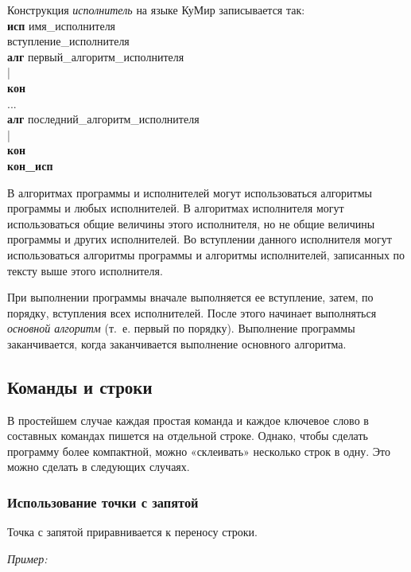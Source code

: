 \documentclass[12pt,a4paper]{article}
\begin{document}
Конструкция \emph{исполнитель} на языке КуМир записывается так:
{\sffamily\\
\textbf{исп} имя\_исполнителя\\
вступление\_исполнителя\\
\textbf{алг} первый\_алгоритм\_исполнителя\\
|\\
\textbf{кон}\\
...\\
\textbf{алг} последний\_алгоритм\_исполнителя\\
|\\
\textbf{кон}\\
\textbf{кон\_исп}
}

В алгоритмах программы и исполнителей могут использоваться алгоритмы программы и любых исполнителей. В алгоритмах исполнителя могут использоваться общие величины этого исполнителя, но не общие величины программы и других исполнителей. Во вступлении данного исполнителя могут использоваться алгоритмы программы и алгоритмы исполнителей, записанных по тексту выше этого исполнителя.

При выполнении программы вначале выполняется ее вступление, затем, по порядку, вступления всех исполнителей. После этого начинает выполняться \emph{основной алгоритм} (т.~е. первый по порядку). Выполнение программы заканчивается, когда заканчивается выполнение основного алгоритма.

\subsection{Команды и строки}

В простейшем случае каждая простая команда и каждое ключевое слово в составных командах пишется на отдельной строке. Однако, чтобы сделать программу более компактной, можно «склеивать» несколько строк в одну. Это можно сделать в следующих случаях.
 
\subsubsection{Использование точки с запятой}

Точка с запятой приравнивается к переносу строки.

\emph{Пример:}
\end{document}
